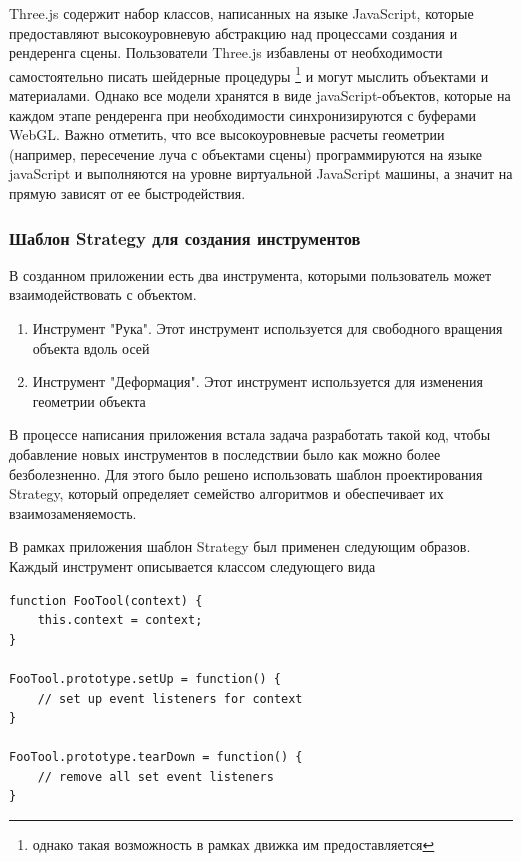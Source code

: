 \documentclass[12pt, a4paper]{article}
\begin{document}
Three.js содержит набор классов, написанных на языке JavaScript, которые
предоставляют высокоуровневую абстракцию над процессами создания и рендеренга
сцены. Пользователи Three.js избавлены от необходимости самостоятельно писать
шейдерные процедуры \footnote{однако такая возможность в рамках движка им
предоставляется} и могут мыслить объектами и материалами. Однако все модели
хранятся в виде javaScript-объектов, которые на каждом этапе рендеренга при
необходимости синхронизируются с буферами WebGL. Важно отметить, что все
высокоуровневые расчеты геометрии (например, пересечение луча с объектами сцены)
программируются на языке javaScript и выполняются на уровне виртуальной
JavaScript машины, а значит на прямую зависят от ее быстродействия.

\subsubsection{Шаблон Strategy для создания инструментов}
В созданном приложении есть два инструмента, которыми пользователь может
взаимодействовать с объектом.
\begin{enumerate}
    \item Инструмент "Рука". Этот инструмент используется для свободного
    вращения объекта вдоль осей
    \item Инструмент "Деформация". Этот инструмент используется для изменения
    геометрии объекта
\end{enumerate}
В процессе написания приложения встала задача разработать такой код, чтобы
добавление новых инструментов в последствии было как можно более безболезненно.
Для этого было решено использовать шаблон проектирования Strategy, который
определяет семейство алгоритмов и обеспечивает их взаимозаменяемость.

В рамках приложения шаблон Strategy был применен следующим образов. Каждый
инструмент описывается классом следующего вида
\begin{lstlisting}
function FooTool(context) {
    this.context = context;
}

FooTool.prototype.setUp = function() {
    // set up event listeners for context
}

FooTool.prototype.tearDown = function() {
    // remove all set event listeners
}
\end{lstlisting}
\end{document}
